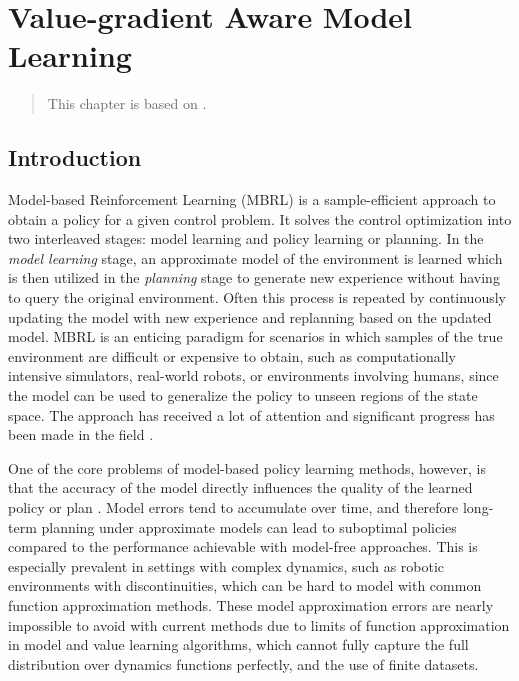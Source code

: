 \chapter{Value-gradient Aware Model Learning}
\label{chap:vagram}

\begin{quote}
    This chapter is based on .
\end{quote}

\newcommand{\revised}[1]{#1}
\section{Introduction}
Model-based Reinforcement Learning (MBRL) is a sample-efficient approach to obtain a policy for a given control problem. 
It solves the control optimization into two interleaved stages: model learning and policy learning or planning. 
In the \emph{model learning} stage, an approximate model of the environment is learned which is then utilized in the \emph{planning} stage to generate new experience without having to query the original environment. 
Often this process is repeated by continuously updating the model with new experience and replanning based on the updated model. 
MBRL is an enticing paradigm for scenarios in which samples of the true environment are difficult or expensive to obtain, such as computationally intensive simulators, real-world robots, or environments involving humans, since the model can be used to generalize the policy to unseen regions of the state space. 
The approach has received a lot of attention and significant progress has been made in the field \parencite{dyna,deisenroth2011pilco,levine2013guided,Hafner2020Dream,moerland,schrittwieser2020mastering}.

One of the core problems of model-based policy learning methods, however, is that the accuracy of the model directly influences the quality of the learned policy or plan \parencite{schneider1997exploiting,kearns2002near,ross2012agnostic,talvitie2017self,luo2018algorithmic,mbpo}. 
Model errors tend to accumulate over time, and therefore long-term planning under approximate models can lead to suboptimal policies compared to the performance achievable with model-free approaches.
This is especially prevalent in settings with complex dynamics, such as robotic environments with discontinuities, which can be hard to model with common function approximation methods.
These model approximation errors are nearly impossible to avoid with current methods due to limits of function approximation in model and value learning algorithms, which cannot fully capture the full distribution over dynamics functions perfectly, and the use of finite datasets.

